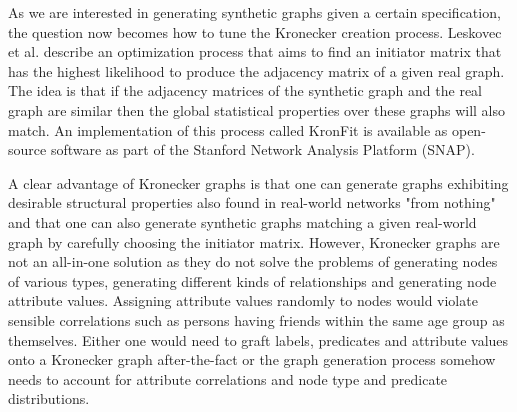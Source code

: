 As we are interested in generating synthetic graphs given a certain specification, the question now becomes how to tune the Kronecker creation process. Leskovec et al. \cite{Edu2010KroneckerLeskovec} describe an optimization process that aims to find an initiator matrix that has the highest likelihood to produce the adjacency matrix of a given real graph. The idea is that if the adjacency matrices of the synthetic graph and the real graph are similar then the global statistical properties over these graphs will also match. An implementation of this process called KronFit is available as open-source software as part of the Stanford Network Analysis Platform (SNAP). \cite{Leskovec2016SNAP:Library}

A clear advantage of Kronecker graphs is that one can generate graphs exhibiting desirable structural properties also found in real-world networks "from nothing" and that one can also generate synthetic graphs matching a given real-world graph by carefully choosing the initiator matrix. However, Kronecker graphs are not an all-in-one solution as they do not solve the problems of generating nodes of various types, generating different kinds of relationships and generating node attribute values. Assigning attribute values randomly to nodes would violate sensible correlations such as persons having friends within the same age group as themselves. Either one would need to graft labels, predicates and attribute values onto a Kronecker graph after-the-fact or the graph generation process somehow needs to account for attribute correlations and node type and predicate distributions.

